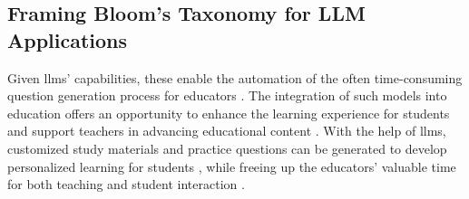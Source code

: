 \vp

\subsection{Framing Bloom's Taxonomy for LLM Applications} \label{sec:blooms-taxonomy}




Given \ac{llms}' capabilities, these enable the automation of the often time-consuming question generation process for educators \cite{vu_chatgpt-based_2024}. The integration of such models into education offers an opportunity to enhance the learning experience for students and support teachers in advancing educational content \cite{naveed_comprehensive_2024}. 
With the help of \ac{llms}, customized study materials and practice questions can be generated to develop personalized learning for students \cite{al_faraby_analysis_2024,bhowmick_automating_2023,hang_mcqgen_2024}, while freeing up the educators' valuable time for both teaching and student interaction \cite{naveed_comprehensive_2024}.


